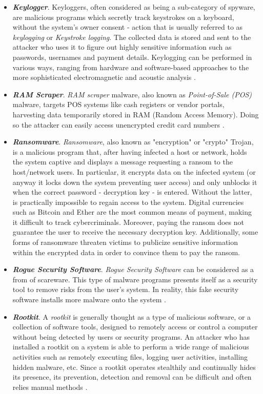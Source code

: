 \documentclass[pdfa%
,cucitura%
]{toptesi}
\begin{document}
\begin{itemize}
	\item \textbf{\textit{Keylogger}}. Keyloggers, often considered as being a sub-category of spyware, are malicious programs which secretly track keystrokes on a keyboard, without the system's owner consent - action that is usually referred to as \textit{keylogging} or \textit{Keystroke logging}. The collected data is stored and sent to the attacker who uses it to figure out highly sensitive information such as passwords, usernames and payment details. Keylogging can be performed in various ways, ranging from hardware and software-based approaches to the more sophisticated electromagnetic and acoustic analysis \cite{MullinsMT}.
	
	\item \textbf{\textit{RAM Scraper}}. \textit{RAM scraper} malware, also known as \textit{Point-of-Sale (POS)} malware, targets POS systems like cash registers or vendor portals, harvesting data temporarily stored in RAM (Random Access Memory). Doing so the attacker can easily access unencrypted credit card numbers \cite{IngallsTOM}.
	
	\item \textbf{\textit{Ransomware}}. \textit{Ransomware}, also known as "encryption" or "crypto" Trojan, is a malicious program that, after having infected a host or network, holds the system captive and displays a message requesting a ransom to the host/network users. In particular, it encrypts data on the infected system (or anyway it locks down the system preventing user access) and only unblocks it when the correct password - decryption key - is entered. Without the latter, is practically impossible to regain access to the system. Digital currencies such as Bitcoin and Ether are the most common means of payment, making it difficult to track cybercriminals. Moreover, paying the ransom does not guarantee the user to receive the necessary decryption key. Additionally, some forms of ransomware threaten victims to publicize sensitive information within the encrypted data in order to convince them to pay the ransom.

	\item \textbf{\textit{Rogue Security Software}}. \textit{Rogue Security Software} can be considered as a from of scareware. This type of malware programs presents itself as a security tool to remove risks from the user's system. In reality, this fake security software installs more malware onto the system \cite{IngallsTOM}.
	
	\item \textbf{\textit{Rootkit}}. A \textit{rootkit} is generally thought as a type of malicious software, or a collection of software tools, designed to remotely access or control a computer without being detected by users or security programs. An attacker who has installed a rootkit on a system is able to perform a wide range of malicious activities such as remotely executing files, logging user activities, installing hidden malware, etc. Since a rootkit operates stealthily and continually hides its presence, its prevention, detection and removal can be difficult and often relies manual methods \cite{DuPaulCMT}.
	

\end{itemize}
\end{document}
